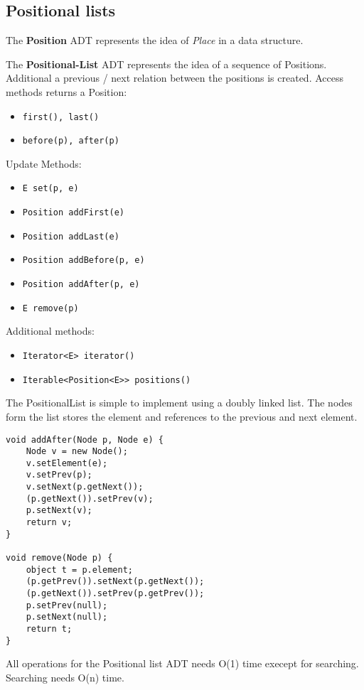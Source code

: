 \documentclass[11pt,twoside,landscape]{article}
\begin{document}
\begin{multicols}{2}
\subsection*{Positional lists}
\label{sec:org4980caa}
The \textbf{Position} ADT represents the idea of \emph{Place} in a data structure.

The \textbf{Positional-List} ADT represents the idea of a sequence of Positions. Additional a previous / next relation between the positions is created. Access methods returns a Position:
\begin{itemize}
\item \texttt{first(), last()}
\item \texttt{before(p), after(p)}
\end{itemize}

Update Methods:
\begin{itemize}
\item \texttt{E set(p, e)}
\item \texttt{Position addFirst(e)}
\item \texttt{Position addLast(e)}
\item \texttt{Position addBefore(p, e)}
\item \texttt{Position addAfter(p, e)}
\item \texttt{E remove(p)}
\end{itemize}

Additional methods:
\begin{itemize}
\item \texttt{Iterator<E> iterator()}
\item \texttt{Iterable<Position<E>> positions()}
\end{itemize}

The PositionalList is simple to implement using a doubly linked list. The nodes form the list stores the element and references to the previous and next element.
\begin{verbatim}
void addAfter(Node p, Node e) {
    Node v = new Node();
    v.setElement(e);
    v.setPrev(p);
    v.setNext(p.getNext());
    (p.getNext()).setPrev(v);
    p.setNext(v);
    return v;
}

void remove(Node p) {
    object t = p.element;
    (p.getPrev()).setNext(p.getNext());
    (p.getNext()).setPrev(p.getPrev());
    p.setPrev(null);
    p.setNext(null);
    return t;
}
\end{verbatim}

All operations for the Positional list ADT needs O(1) time execept for searching. Searching needs O(n) time.


\end{multicols}
\end{document}
